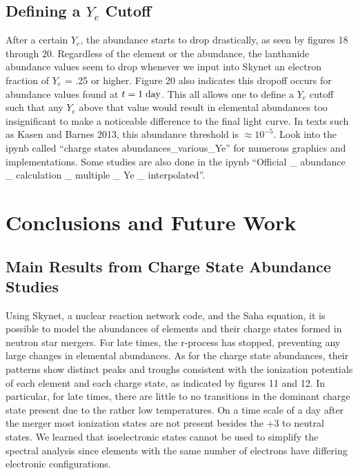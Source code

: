 \documentclass[11pt,a4paper]{article}
\begin{document}
\pagebreak 

\subsection{Defining a $Y_e$ Cutoff}

After a certain $Y_e$, the abundance starts to drop drastically, as seen by figures 18 through 20. Regardless of the element or the abundance, the lanthanide abundance values seem to drop whenever we input into Skynet an electron fraction of $Y_e$ = .25 or higher. Figure 20 also indicates this dropoff occurs for abundance values found at $t = \mathrm{1 \hspace{1 mm} day}$. This all allows one to define a $Y_e$ cutoff such that any $Y_e$ above that value would result in elemental abundances too insignificant to make a noticeable difference to the final light curve. In texts such as Kasen and Barnes 2013, this abundance threshold is $\approx 10^{-5}$.  
Look into the ipynb called “charge states abundances\_various\_Ye” for numerous graphics and implementations. Some studies are also done in the ipynb “Official \_ abundance \_ calculation \_ multiple \_ Ye \_ interpolated”. 

\section{Conclusions and Future Work}







\subsection{Main Results from Charge State Abundance Studies}

Using Skynet, a nuclear reaction network code, and the Saha equation, it is possible to model the abundances of elements and their charge states formed in neutron star mergers. For late times, the r-process has stopped, preventing any large changes in elemental abundances. As for the charge state abundances, their patterns show distinct peaks and troughs consistent with the ionization potentials of each element and each charge state, as indicated by figures 11 and 12. 
In particular, for late times, there are little to no transitions in the dominant charge state present due to the rather low temperatures. On a time scale of a day after the merger most ionization states are not present besides the +3 to neutral states. 
We learned that isoelectronic states cannot be used to simplify the spectral analysis since elements with the same number of electrons have differing electronic configurations. \\
\end{document}
